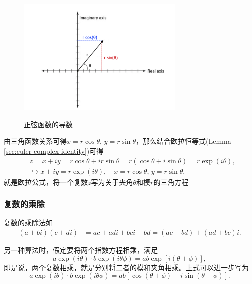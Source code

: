 \begin{subappendices}
\begin{figure}[htbp]
  \caption{正弦函数的导数}
  \centering
  \includegraphics[width=8cm]{./Figures/20180401-complex-plane}
  \label{fig:euler-complex-plane}
%
\end{figure}

由三角函数关系可得$x = r \cos \theta, \, y = r \sin \theta$，那么结合欧拉恒等式(Lemma \ref{sec:euler-complex-identity})可得
\begin{equation}
  \label{eq:euler-coordinates-complex-plane-z}
\begin{split}
    & z = x + i y = r \cos \theta + i r \sin \theta = r \left( \cos \theta + i \sin \theta \right) = r \exp \left( i \theta \right), \\
    & \hookrightarrow x + i y = r \exp \left( i \theta \right), \quad x = r \cos \theta, \, y = r \sin \theta,
\end{split}
\end{equation}
就是欧拉公式，将一个复数$z$写为关于夹角$\theta$和模$r$的三角方程

\subsubsection{复数的乘除}
\label{sec:euler-complex-multi-divid}
复数的乘除法如
\begin{equation*}
\begin{split}
  \left( a + b i \right) \left( c + d i \right)
  & = ac + a d i + b c i - b d = \left( ac - bd \right) + \left( ad + bc \right) i.
\end{split}
\end{equation*}

另一种算法时，假定要将两个指数方程相乘，满足
\begin{equation*}
  a \exp \left( i \theta \right) \cdot b \exp \left( i \theta \phi \right) = ab \exp \left[ i \left(\theta + \phi \right) \right],
\end{equation*}
即是说，两个复数相乘，就是分别将二者的模和夹角相乘。上式可以进一步写为
\begin{equation*}
  a \exp \left( i \theta \right) \cdot b \exp \left( i \theta \phi \right) = ab \left[ \cos \left( \theta + \phi \right) + i \sin \left( \theta + \phi \right) \right].
\end{equation*}


\end{subappendices}
